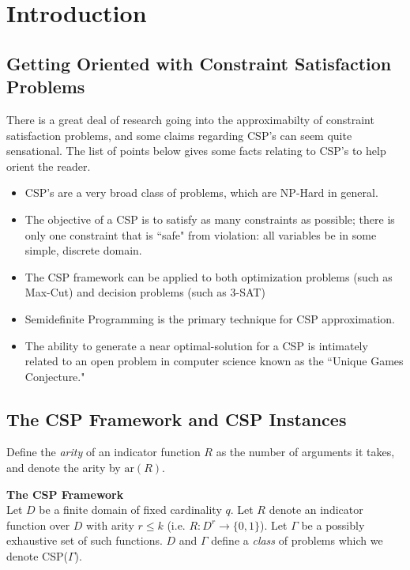 \documentclass[12pt]{article}
\begin{document}
\section{Introduction}

\subsection{Getting Oriented with Constraint Satisfaction Problems}

There is a great deal of research going into the approximabilty of constraint satisfaction problems, and some claims regarding CSP's can seem quite sensational. 
The list of points below gives some facts relating to CSP's to help orient the reader.

\begin{itemize}
\item CSP's are a very broad class of problems, which are NP-Hard in general.
\item The objective of a CSP is to satisfy as many constraints as possible; there is only one constraint that is ``safe" from violation: all variables be in some simple, discrete domain.
\item The CSP framework can be applied to both optimization problems (such as Max-Cut) and decision problems (such as 3-SAT)
\item Semidefinite Programming is the primary technique for CSP approximation.
\item The ability to generate a near optimal-solution for a CSP is intimately related to an open problem in computer science known as the ``Unique Games Conjecture."
\end{itemize}


\subsection{The CSP Framework and CSP Instances}
Define the \textit{arity} of an indicator function $R$ as the number of arguments it takes, and denote the arity by $\text{ar}(R)$.

\begin{definition}
\textbf{The CSP Framework} \\
Let $D$ be a finite domain of fixed cardinality $q$. 
Let $R$ denote an indicator function over $D$ with arity $r \leq k$ (i.e. $R:D^r \to \{0,1\}$). 
Let $\Gamma$ be a possibly exhaustive set of such functions. 
$D$ and $\Gamma$ define a \textit{class} of problems which we denote CSP($\Gamma$).
\label{def:CSPframework}
\end{definition}
\end{document}
